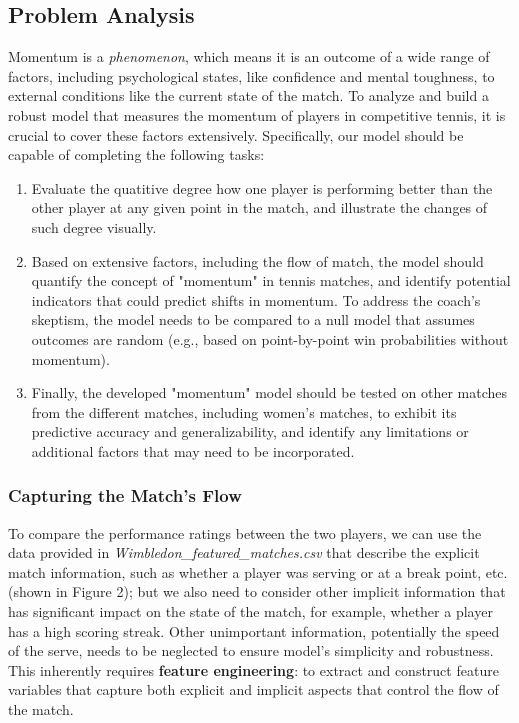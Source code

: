 \documentclass[12pt]{article}  %
\begin{document}
\subsection{Problem Analysis}

Momentum is a \textit{phenomenon}, which means it is an outcome of a wide range of factors, including psychological states, like confidence and mental toughness, to external conditions like the current state of the match. To analyze and build a robust model that measures the momentum of players in competitive tennis, it is crucial to cover these factors extensively. Specifically, our model should be capable of completing the following tasks:

\begin{enumerate}[\bfseries (1)]
\setlength{\parsep}{0ex} %
\setlength{\topsep}{2ex} %
\setlength{\itemsep}{1ex} %
\item Evaluate the quatitive degree how one player is performing better than the other player at any given point in the match, and illustrate the changes of such degree visually.
\item Based on extensive factors, including the flow of match, the model should quantify the concept of "momentum" in tennis matches, and identify potential indicators that could predict shifts in momentum. To address the coach’s skeptism, the model needs to be compared to a null model that assumes outcomes are random (e.g., based on point-by-point win probabilities without momentum).
\item Finally, the developed "momentum" model should be tested on other matches from the different matches, including women's matches, to exhibit its predictive accuracy and generalizability, and identify any limitations or additional factors that may need to be incorporated. 
\end{enumerate}

\subsubsection{Capturing the Match's Flow}
To compare the performance ratings between the two players, we can use the data provided in \textit{Wimbledon\_featured\_matches.csv} that describe the explicit match information, such as whether a player was serving or at a break point, etc. (shown in Figure 2); but we also need to consider other implicit information that has significant impact on the state of the match, for example, whether a player has a high scoring streak. Other unimportant information, potentially the speed of the serve, needs to be neglected to ensure model's simplicity and robustness. This inherently requires \textbf{feature engineering}: to extract and construct feature variables that capture both explicit and implicit aspects that control the flow of the match.
\end{document}
